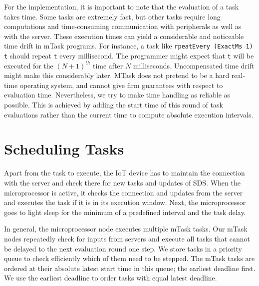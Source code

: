 \documentclass[runningheads]{llncs}
\newcommand{\CleanInline}[1]{\lstinline[language=Clean]!#1!}
\newcommand{\prog}[1]{\CleanInline{#1}}
\begin{document}
For the implementation, it is important to note that the evaluation of a task takes time.
Some tasks are extremely fast, but other tasks require long computations and time-consuming communication with peripherals as well as with the server.
These execution times can yield a considerable and noticeable time drift in mTask programs.
For instance, a task like \prog{rpeatEvery (ExactMs 1) t} should repeat \prog{t} every millisecond.
The programmer might expect that \prog{t} will be executed for the ${(N+1)}^{th}$ time after $N$ milliseconds.
Uncompensated time drift might make this considerably later.
MTask does not pretend to be a hard real-time operating system, and cannot give firm guarantees with respect to evaluation time.
Nevertheless, we try to make time handling as reliable as possible.
This is achieved by adding the start time of this round of task evaluations rather than the current time to compute absolute execution intervals.


\section{Scheduling Tasks}

Apart from the task to execute, the IoT device has to maintain the connection with the server and check there for new tasks and updates of {SDS}.
When the microprocessor is active, it checks the connection and updates from the server and executes the task if it is in its execution window.
Next, the microprocessor goes to light sleep for the minimum of a predefined interval and the task delay.

In general, the microprocessor node executes multiple mTask tasks.
Our mTask nodes repeatedly check for inputs from servers and execute all tasks that cannot be delayed to the next evaluation round one step.
We store tasks in a priority queue to check efficiently which of them need to be stepped.
The mTask tasks are ordered at their absolute latest start time in this queue; the earliest deadline first.
We use the earliest deadline to order tasks with equal latest deadline.
\end{document}
